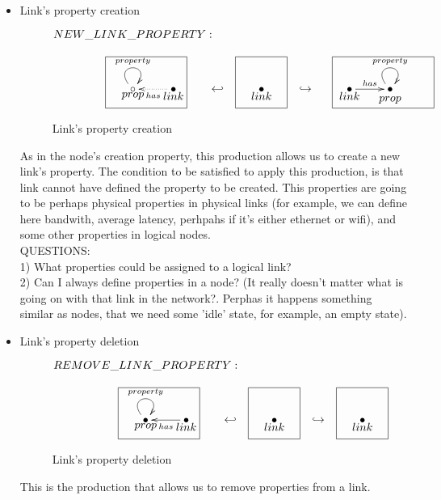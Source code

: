 \documentclass[envcountsect,runningheads]{llncs}
\begin{document}
\begin{itemize}
  \item Link's property creation
  \begin{figure}[H]
    \[
       \xymatrix@C=25pt@R=16pt
       {
         {}\POS[]+<0pc,2pc>\drop{NEW\_LINK\_PROPERTY:}
         \\
         {\circ}\ar@(ul,ur)^{property} \POS[]-<0pc,.5pc>\drop{prop} & 
         {\bullet} \ar@{.>}^{has}[l] \POS[]-<0pc,.5pc>\drop{link}
         \POS[]+<-2pc,.5pc> *+=<6pc,3.8pc>[F-]{} 
         & {\hookleftarrow} &
         {\bullet}\POS[]-<0pc,.5pc>\drop{link}
         \POS[]+<0pc,.5pc> *+=<3.8pc,3.8pc>[F-]{} & {\hookrightarrow} &
         {\bullet}\ar@{->}^{has}[r]\POS[]-<0pc,.5pc>\drop{link}
         \POS[]+<2.5pc,.5pc> *+=<7.5pc,3.8pc>[F-]{} &
         {\bullet}\ar@(ul,ur)^{property}
         \POS[]+<0pc,.5pc>*+=<3pc,3pc>[]{}\POS[]-<0pc,.8pc>\drop{prop}
       }
    \]
    \caption{Link's property creation}
    \protect\label{fig:linkpropertycreation}
  \end{figure}
  As in the node's creation property, this production allows us to create a new 
  link's property. The condition to be satisfied to apply this production, is 
  that link cannot have defined the property to be created.
  This properties are going to be 
  perhaps physical properties in physical links (for example, we can define here bandwith, 
  average latency, perhpahs if it's either ethernet or wifi), and some other properties in logical 
  nodes.\\
  QUESTIONS:\\
  1) What properties could be assigned to a logical link? \\
  2) Can I always define properties in a node? (It really doesn't matter what is going on with 
  that link in the network?. Perphas it happens something similar as nodes, that we need some 
  'idle' state, for example, an empty state).\\
  
  \item Link's property deletion
  \begin{figure}[H]
    \[
       \xymatrix@C=25pt@R=16pt
       {
         {}\POS[]+<0pc,2pc>\drop{REMOVE\_LINK\_PROPERTY:}
         \\
         {\bullet}\ar@(ul,ur)^{property} \POS[]-<0pc,.5pc>\drop{prop} & 
         {\bullet} \ar@{->}^{has}[l] \POS[]-<0pc,.5pc>\drop{link}
         \POS[]+<-2pc,.5pc> *+=<6pc,3.8pc>[F-]{} 
         & {\hookleftarrow} &
         {\bullet}\POS[]-<0pc,.5pc>\drop{link}
         \POS[]+<0pc,.5pc> *+=<3.8pc,3.8pc>[F-]{} & {\hookrightarrow} &
         {\bullet}\POS[]-<0pc,.5pc>\drop{link}
         \POS[]+<0pc,.5pc> *+=<3.8pc,3.8pc>[F-]{} 
       }
    \]
    \caption{Link's property deletion}
    \protect\label{fig:linkpropertydeletion}
  \end{figure}
  This is the production that allows us to remove properties from a link.\\
  
  \end{itemize}
  
\end{document}
